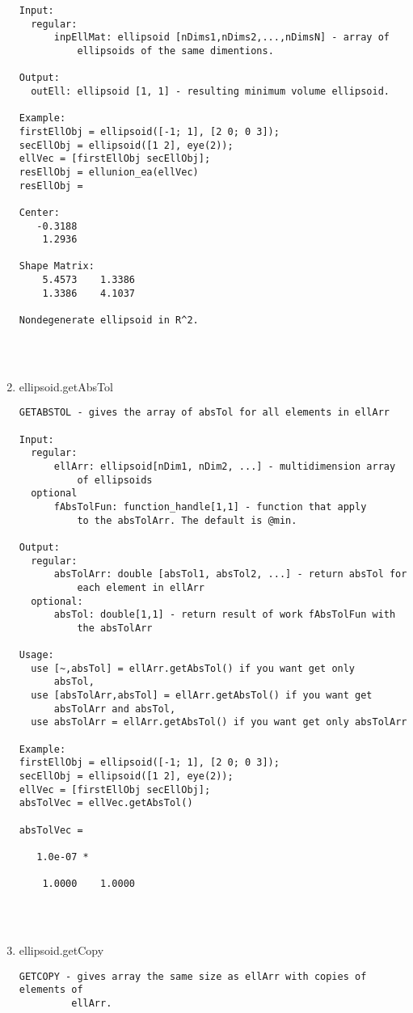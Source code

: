 \begin{enumerate}
\begin{lstlisting}
Input:
  regular:
      inpEllMat: ellipsoid [nDims1,nDims2,...,nDimsN] - array of
          ellipsoids of the same dimentions.

Output:
  outEll: ellipsoid [1, 1] - resulting minimum volume ellipsoid.

Example:
firstEllObj = ellipsoid([-1; 1], [2 0; 0 3]);
secEllObj = ellipsoid([1 2], eye(2));
ellVec = [firstEllObj secEllObj];
resEllObj = ellunion_ea(ellVec)
resEllObj =

Center:
   -0.3188
    1.2936

Shape Matrix:
    5.4573    1.3386
    1.3386    4.1037

Nondegenerate ellipsoid in R^2.




\end{lstlisting}
\fontfamily{\familydefault}
\selectfont
\item {ellipsoid.getAbsTol}
\selectfont
\begin{lstlisting}
GETABSTOL - gives the array of absTol for all elements in ellArr

Input:
  regular:
      ellArr: ellipsoid[nDim1, nDim2, ...] - multidimension array
          of ellipsoids
  optional
      fAbsTolFun: function_handle[1,1] - function that apply
          to the absTolArr. The default is @min.

Output:
  regular:
      absTolArr: double [absTol1, absTol2, ...] - return absTol for
          each element in ellArr
  optional:
      absTol: double[1,1] - return result of work fAbsTolFun with
          the absTolArr

Usage:
  use [~,absTol] = ellArr.getAbsTol() if you want get only
      absTol,
  use [absTolArr,absTol] = ellArr.getAbsTol() if you want get
      absTolArr and absTol,
  use absTolArr = ellArr.getAbsTol() if you want get only absTolArr

Example:
firstEllObj = ellipsoid([-1; 1], [2 0; 0 3]);
secEllObj = ellipsoid([1 2], eye(2));
ellVec = [firstEllObj secEllObj];
absTolVec = ellVec.getAbsTol()

absTolVec =

   1.0e-07 *

    1.0000    1.0000




\end{lstlisting}
\fontfamily{\familydefault}
\selectfont
\item {ellipsoid.getCopy}
\selectfont
\begin{lstlisting}
GETCOPY - gives array the same size as ellArr with copies of elements of
         ellArr.


\end{lstlisting}
\end{enumerate}
